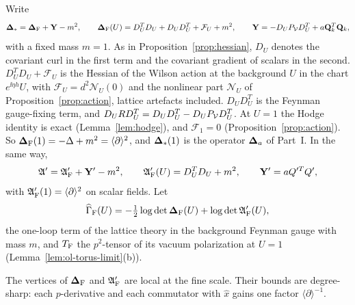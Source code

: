 Write
\[
\boldsymbol{\Delta}_*=\boldsymbol{\Delta}_{\rm F}+\mathbf Y-m^2,\qquad \boldsymbol{\Delta}_{\rm F}(U)=D_U^TD_U+D_UD_U^T+\mathcal F_U+m^2,\qquad\mathbf Y=-D_UP_\mathcal V D_U^T+a\mathbf Q_k^T\mathbf Q_k ,
\]
with a fixed mass $m=1$. As in Proposition~\ref{prop:hessian}, $D_U$ denotes the covariant curl in the first term and the covariant gradient of scalars in the second. $D_U^TD_U+\mathcal F_U$ is the Hessian of the Wilson action at the background $U$ in the chart $e^{\ii\eta h}U$, with $\mathcal F_U=d^2\mathcal N_U(0)$ and the nonlinear part $\mathcal N_U$ of Proposition~\ref{prop:action}, lattice artefacts included. $D_UD_U^T$ is the Feynman gauge-fixing term, and $D_URD_U^T=D_UD_U^T-D_UP_\mathcal V D_U^T$. At $U=1$ the Hodge identity is exact (Lemma~\ref{lem:hodge}), and $\mathcal F_1=0$ (Proposition~\ref{prop:action}). So $\boldsymbol{\Delta}_{\rm F}(1)=-\Delta+m^2=\langle\partial\rangle^2$, and $\boldsymbol{\Delta}_*(1)$ is the operator $\boldsymbol{\Delta}_a$ of Part~I. In the same way,
\[
\mathfrak A'=\mathfrak A'_{\rm F}+\mathbf Y'-m^2,\qquad\mathfrak A'_{\rm F}(U)=D_U^TD_U+m^2,\qquad\mathbf Y'=aQ'^TQ',
\]
with $\mathfrak A'_{\rm F}(1)=\langle\partial\rangle^2$ on scalar fields. Let
\[
\widehat\Gamma_{\rm F}(U)=-\tfrac12\log\det\boldsymbol{\Delta}_{\rm F}(U)+\log\det\mathfrak A'_{\rm F}(U),
\]
the one-loop term of the lattice theory in the background Feynman gauge with mass $m$, and $T_{\rm F}$ the $p^2$-tensor of its vacuum polarization at $U=1$ (Lemma~\ref{lem:ol-torus-limit}(b)).

The vertices of $\boldsymbol{\Delta}_{\rm F}$ and $\mathfrak A'_{\rm F}$ are local at the fine scale. Their bounds are degree-sharp: each $p$-derivative and each commutator with $\hat x$ gains one factor $\langle\partial\rangle^{-1}$.

